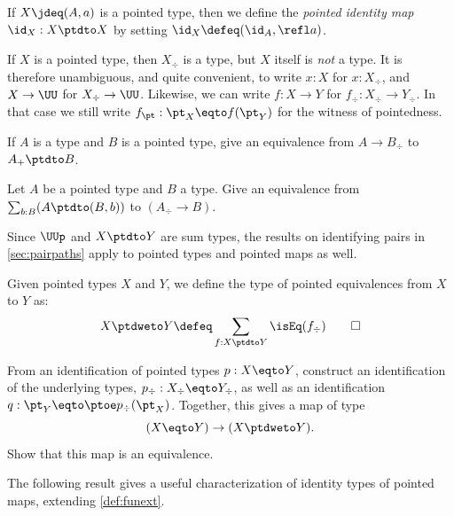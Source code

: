 \begin{definition}\label{def:pointedidentity}
  If $X \jdeq (A,a)$ is a pointed type, then we define the \emph{pointed identity map}
  $\id_X : X \ptdto X$ by setting $\id_X \defeq (\id_A, \refl a)$.
\end{definition}

\begin{remark}\label{rem:coerceawaypt}
If $X$ is a pointed type, then $X_\div $ is a type, but $X$ itself is
\emph{not} a type. It is therefore unambiguous, and quite convenient,
to write $x:X$ for $x:X_\div$, and $X\to\UU$ for $X_\div\to\UU$.
Likewise, we can write $f : X \to Y$ for $f_\div : X_\div \to Y_\div$.
In that case we still write $f_\pt : \pt_X \eqto f(\pt_Y)$ for the
witness of pointedness.
\end{remark}

\begin{xca}\label{xca:plusforgetadjoint}
If $A$ is a type and $B$ is a pointed type,
give an equivalence from $A\to B_\div$ to $A_+\ptdto B$.
\end{xca}

\begin{xca}\label{xca:freemaps}
  Let $A$ be a pointed type and $B$ a type. Give an equivalence from
  $\sum_{b:B}(A\ptdto (B,b))$ to $(A_\div\to B)$.
\end{xca}

Since $\UUp$ and $X\ptdto Y$ are sum types, the results on identifying pairs
in \cref{sec:pairpaths} apply to pointed types and pointed maps as well.

\begin{definition}\label{def:pointedequiv}
Given pointed types $X$ and $Y$, we define the type of pointed
equivalences from $X$ to $Y$ as:
  \[
    X \ptdweto Y \defeq \sum_{f : X \ptdto Y}\isEq(f_\div)\qedhere
  \]
\end{definition}
\begin{xca}\label{xca:pointedequiv}
  From an identification of pointed types $p : X \eqto Y$,
  construct an identification of the underlying types, $p_\div : X_\div \eqto Y_\div$,
  as well as an identification $q : \pt_Y \eqto \ptoe p_\div(\pt_X)$.
  Together, this gives a map of type
  \[
    (X \eqto Y) \to (X \ptdweto Y).
  \]
  Show that this map is an equivalence.
\end{xca}

The following result gives a useful characterization of 
identity types of pointed maps, extending \cref{def:funext}.

